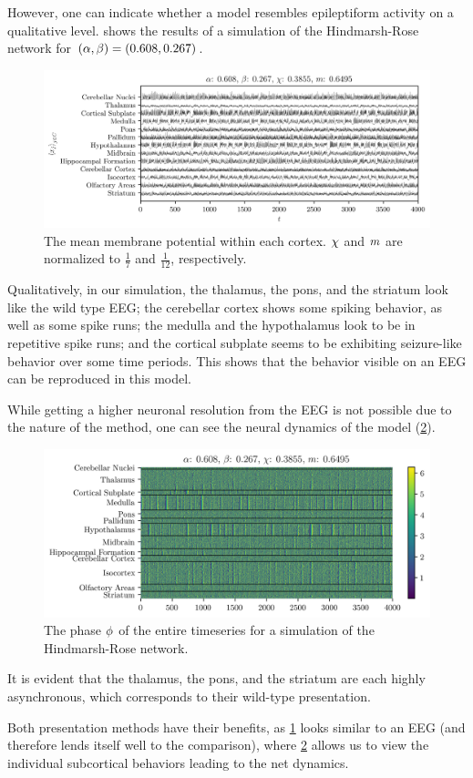However, one can indicate whether a model resembles epileptiform activity on a qualitative level.
 shows the results of a simulation of the Hindmarsh-Rose network for $\pqty{\hra, \hrb} = \pqty{0.608, 0.267}$.
\begin{figure}[ht]
  \centering
  \includegraphics[width=\textwidth]{figure/means-0_608-0_267}
  \caption[Mean potential by cortex]{The mean membrane potential within each cortex.
    $\chi$ and $m$ are normalized to $\frac{1}{7}$ and $\frac{1}{12}$, respectively.
  }
  \label{fig:mean_608_267}
\end{figure}
Qualitatively, in our simulation,
the thalamus, the pons, and the striatum look like the wild type EEG;
the cerebellar cortex shows some spiking behavior,
as well as some spike runs;
the medulla and the hypothalamus look to be in repetitive spike runs;
and the cortical subplate seems to be exhibiting seizure-like behavior over some time periods.
This shows that the behavior visible on an EEG can be reproduced in this model.

While getting a higher neuronal resolution from the EEG is not possible due to the nature of the method,
one can see the neural dynamics of the model (\cref{fig:overhead_608_267}).
\begin{figure}[ht]
  \centering
  \includegraphics[width=\textwidth]{figure/overhead-0_608-0_267}
  \caption[Hindmarsh-Rose time series]{The phase $\phi$ of the entire timeseries for a simulation of the Hindmarsh-Rose network.}
  \label{fig:overhead_608_267}
\end{figure}
It is evident that the thalamus, the pons, and the striatum are each highly asynchronous, which corresponds to their wild-type presentation.

Both presentation methods have their benefits, as \cref{fig:mean_608_267} looks similar to an EEG (and therefore lends itself well to the comparison), where \cref{fig:overhead_608_267} allows us to view the individual subcortical behaviors leading to the net dynamics.

